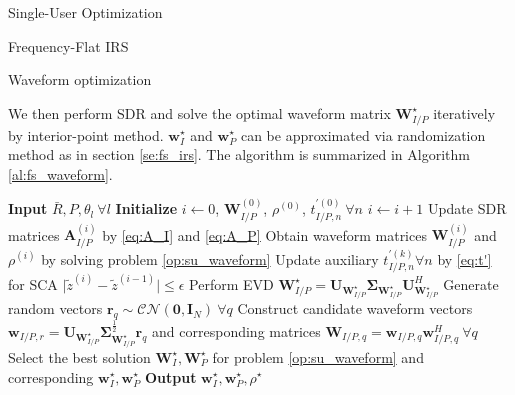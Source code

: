\documentclass{IEEEtran}
\begin{document}
\begin{section}{Single-User Optimization}
\begin{subsection}{Frequency-Flat IRS}
\begin{subsubsection}{Waveform optimization}
\begin{maxi!}
			\end{maxi!}
			We then perform SDR and solve the optimal waveform matrix $\boldsymbol{W}_{I/P}^{\star}$ iteratively by interior-point method. $\boldsymbol{w}_I^{\star}$ and $\boldsymbol{w}_P^{\star}$ can be approximated via randomization method as in section \ref{se:fs_irs}. The algorithm is summarized in Algorithm \ref{al:fs_waveform}.

			\begin{algorithm}
				\caption{Waveform Optimization}
				\label{alg:waveform}
				\begin{algorithmic}[1]
					\State \textbf{Input} $\bar{R},P,\theta_l \ \forall l$
					\State \textbf{Initialize} $i \leftarrow 0$, $\boldsymbol{W}_{I/P}^{(0)}$, $\rho^{(0)}$, $t_{I/P,n}^{\prime (0)} \ \forall n$
					\Repeat
					\State $i \leftarrow i + 1$
					\State Update SDR matrices $\boldsymbol{A}_{I/P}^{(i)}$ by \ref{eq:A_I} and \ref{eq:A_P}
					\State Obtain waveform matrices $\boldsymbol{W}_{I/P}^{(i)}$ and $\rho^{(i)}$ by solving problem \ref{op:su_waveform}
					\State Update auxiliary $t_{I/P,n}^{\prime (k)} \forall n$ by \ref{eq:t'} for SCA
					\Until $\lvert \tilde{z}^{(i)}-\tilde{z}^{(i-1)} \rvert \le \epsilon$
					\State Perform EVD $\boldsymbol{W}_{I/P}^{\star}=\boldsymbol{U}_{\boldsymbol{W}_{I/P}^{\star}}\boldsymbol{\Sigma}_{\boldsymbol{W}_{I/P}^{\star}}\boldsymbol{U}_{\boldsymbol{W}_{I/P}^{\star}}^H$
					\State Generate random vectors $\boldsymbol{r}_q \sim \mathcal{CN}(\boldsymbol{0},\boldsymbol{I}_{N}) \ \forall q$
					\State Construct candidate waveform vectors $\boldsymbol{w}_{I/P,r}=\boldsymbol{U}_{\boldsymbol{W}_{I/P}^{\star}}\boldsymbol{\Sigma}_{\boldsymbol{W}_{I/P}^{\star}}^{\frac{1}{2}}\boldsymbol{r}_q$ and corresponding matrices $\boldsymbol{W}_{I/P,q}=\boldsymbol{w}_{I/P,q}\boldsymbol{w}_{I/P,q}^H  \ \forall q$
					\State Select the best solution $\boldsymbol{W}_{I}^\star,\boldsymbol{W}_{P}^\star$ for problem \ref{op:su_waveform} and corresponding $\boldsymbol{w}_{I}^\star, \boldsymbol{w}_{P}^\star$
					\State \textbf{Output} $\boldsymbol{w}_I^\star, \boldsymbol{w}_P^\star, \rho^\star$
				\end{algorithmic}
			\end{algorithm}
		\end{subsubsection}
	\end{subsection}
\end{section}



\end{document}
